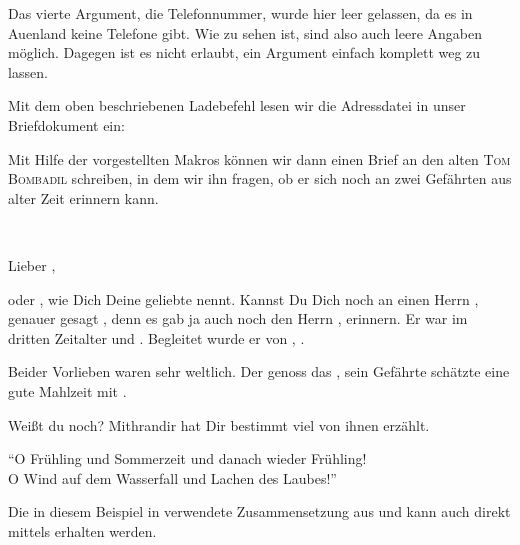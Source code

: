 Das vierte Argument, die Telefonnummer, wurde hier leer gelassen,
da es in Auenland keine Telefone gibt. Wie zu sehen ist, sind also auch leere
Angaben möglich. Dagegen ist es nicht erlaubt, ein Argument einfach komplett
weg zu lassen.

\BeginIndexGroup
{}
Mit dem oben beschriebenen Ladebefehl lesen wir die Adressdatei
in unser Briefdokument ein:
\begin{lstcode}
\end{lstcode}
\EndIndexGroup

\BeginIndexGroup
{}%
%
%
%
%
%
%
%
%
Mit Hilfe der vorgestellten Makros können wir dann einen Brief
an den alten \textsc{Tom Bombadil} schreiben, in dem wir ihn
fragen, ob er sich noch an zwei Gefährten aus alter Zeit
erinnern kann.
\begin{lstcode}
  \begin{letter}{\\}
    \opening{Lieber  ,}
     
    oder , wie Dich Deine geliebte 
    nennt. Kannst Du Dich noch an einen Herrn 
    , genauer gesagt , denn es gab
    ja auch noch den Herrn , erinnern. Er war 
     im dritten Zeitalter und .
    Begleitet wurde er von , .
      
    Beider Vorlieben waren sehr weltlich. Der 
     genoss das , sein Gefährte
    schätzte eine gute Mahlzeit mit .
      
    Weißt du noch? Mithrandir hat Dir bestimmt viel von ihnen 
    erzählt.
    \closing{"`O Frühling und Sommerzeit
                 und danach wieder Frühling!\\
               O Wind auf dem Wasserfall
                 und Lachen des Laubes!"'}
  \end{letter}
\end{lstcode}
Die in diesem Beispiel in  verwendete
Zusammensetzung aus  und
 kann auch direkt mittels
 erhalten werden.

